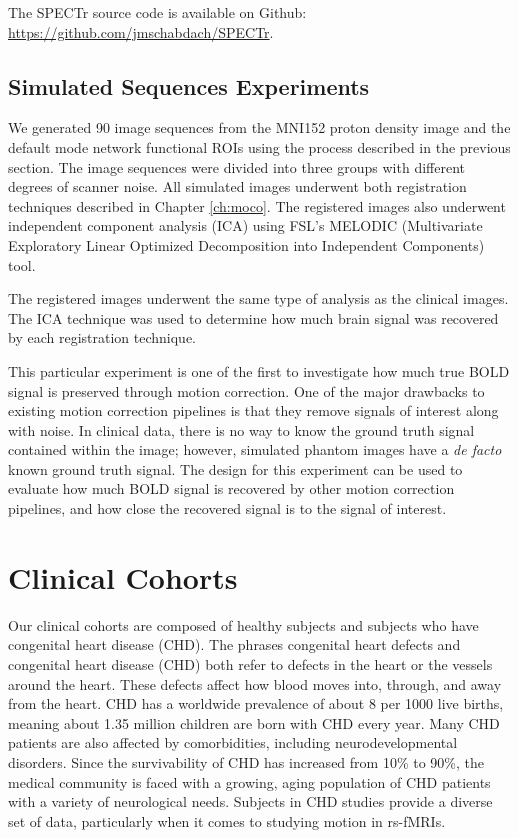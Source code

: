 The SPECTr source code is available on Github: \url{https://github.com/jmschabdach/SPECTr}.

\subsection{Simulated Sequences Experiments}

We generated 90 image sequences from the MNI152 proton density image and the default mode network functional ROIs using the process described in the previous section. The image sequences were divided into three groups with different degrees of scanner noise. All simulated images underwent both registration techniques described in Chapter \ref{ch:moco}. The registered images also underwent independent component analysis (ICA) using FSL's MELODIC (Multivariate Exploratory Linear Optimized Decomposition into Independent Components) tool.

The registered images underwent the same type of analysis as the clinical images. The ICA technique was used to determine how much brain signal was recovered by each registration technique.

This particular experiment is one of the first to investigate how much true BOLD signal is preserved through motion correction. One of the major drawbacks to existing motion correction pipelines is that they remove signals of interest along with noise. In clinical data, there is no way to know the ground truth signal contained within the image; however, simulated phantom images have a \textit{de facto} known ground truth signal. The design for this experiment can be used to evaluate how much BOLD signal is recovered by other motion correction pipelines, and how close the recovered signal is to the signal of interest.


\section{Clinical Cohorts}

Our clinical cohorts are composed of healthy subjects and subjects who have congenital heart disease (CHD).
The phrases congenital heart defects and congenital heart disease (CHD) both refer to defects in the heart or the vessels around the heart. These defects affect how blood moves into, through, and away from the heart. 
CHD has a worldwide prevalence of about 8 per 1000 live births, meaning about 1.35 million children are born with CHD every year. Many CHD patients are also affected by comorbidities, including neurodevelopmental disorders. Since the survivability of CHD has increased from 10\% to 90\%, the medical community is faced with a growing, aging population of CHD patients with a variety of neurological needs. Subjects in CHD studies provide a diverse set of data, particularly when it comes to studying motion in rs-fMRIs.

